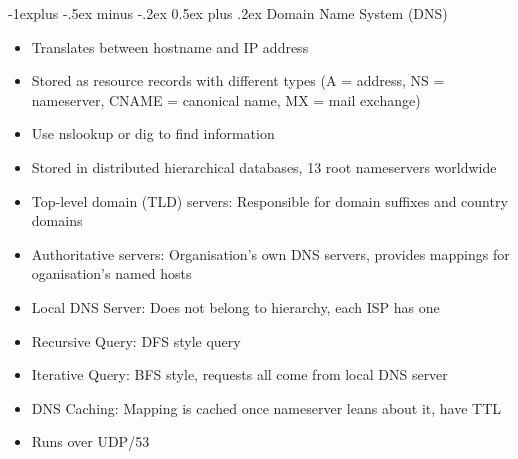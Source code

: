 \documentclass[10pt, landscape]{article}
\makeatletter
\renewcommand{\section}{\@startsection{section}{1}{0mm}%
                                {-1ex plus -.5ex minus -.2ex}%
                                {0.5ex plus .2ex}%
                                {\normalfont\large\bfseries}}
\renewcommand{\section}{\@startsection{section}{2}{0mm}%
                                {-1explus -.5ex minus -.2ex}%
                                {0.5ex plus .2ex}%
                                {\normalfont\normalsize\bfseries}}
\makeatother
\begin{document}
\begin{multicols*}{3}
\section{Domain Name System (DNS)}
\begin{itemize}
    \item Translates between hostname and IP address
    \item Stored as resource records with different types (A = address, NS = nameserver, CNAME = canonical name, MX = mail exchange)
    \item Use nslookup or dig to find information
    \item Stored in distributed hierarchical databases, 13 root nameservers worldwide
    \item Top-level domain (TLD) servers: Responsible for domain suffixes and country domains
    \item Authoritative servers: Organisation's own DNS servers, provides mappings for oganisation's named hosts
    \item Local DNS Server: Does not belong to hierarchy, each ISP has one
    \item Recursive Query: DFS style query
    \item Iterative Query: BFS style, requests all come from local DNS server
    \item DNS Caching: Mapping is cached once nameserver leans about it, have TTL
    \item Runs over UDP/53
\end{itemize}


\end{multicols*}
\end{document}
